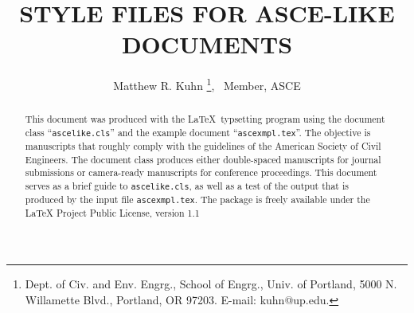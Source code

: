 \documentclass[Proceedings]{ascelike}
\begin{document}
%
\title{STYLE FILES FOR ASCE-LIKE DOCUMENTS}
%
\author{
Matthew R. Kuhn%
\thanks{
Dept. of Civ. and Env. Engrg.,
School of Engrg., Univ. of Portland, 5000 N. Willamette Blvd.,
Portland, OR  97203. E-mail: kuhn@up.edu.},
\ Member, ASCE
%
}
%
\maketitle
%
\begin{abstract}
This document was produced with the \LaTeX\ typsetting program
using the document class ``\texttt{ascelike.cls}'' and the
example document ``\texttt{ascexmpl.tex}''.
The objective is manuscripts that roughly comply with the
guidelines of the American Society of Civil Engineers.
The document class
produces either double-spaced manuscripts for journal submissions or
camera-ready manuscripts
for conference proceedings.
This document serves as a brief guide to \texttt{ascelike.cls},
as well as a test of the output that is produced
by the input file \texttt{ascexmpl.tex}.
The package is freely available under the LaTeX 
Project Public License, version 1.1
\end{abstract}
%
%
%
\end{document}
